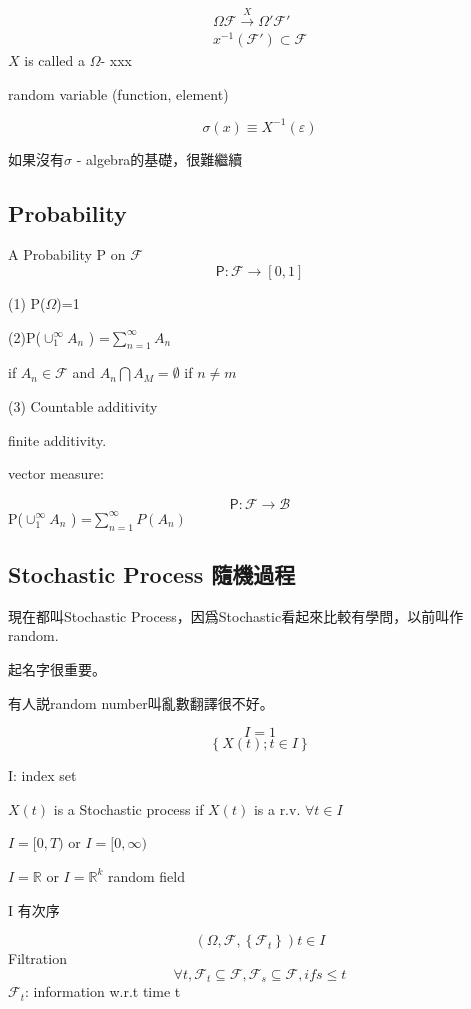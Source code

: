 \documentclass[UTF8,a4paper,14pt]{ctexart}
\theoremstyle{definition}
\theoremstyle{remark}
\begin{document}
\begin{equation}
  \begin{aligned}
   \Omega \mathcal{F}  \overset{X}{\rightarrow }\Omega' \mathcal{F}' \\
x^{-1}(\mathcal{F} ') \subset \mathcal{F}    
  \end{aligned}
\end{equation}
$X$ is called a $\Omega$- xxx

random variable (function, element)

\[\sigma (x)\equiv X^{-1}(\varepsilon )\]

如果沒有$\sigma$ - algebra的基礎，很難繼續

\subsection{Probability}
A Probability P on $\mathcal{F} $
\[\mathsf{P} :\mathcal{F} \rightarrow [0,1]\]

(1) P($\Omega$)=1

(2)P($\cup_1^{\infty} A_n$ ) =$ \sum_{n = 1}^{\infty} A_n   $

if \(A_n\in \mathcal{F}  \) and \(A_n \bigcap A_M = \emptyset  \) if \(n\neq m\)

(3) Countable additivity

finite additivity.

vector measure:

\[\mathsf{P} :\mathcal{F} \rightarrow \mathcal{B} \]
P($\cup_1^{\infty} A_n$ ) =$ \sum_{n = 1}^{\infty} P(A_n )  $


\subsection{Stochastic Process 隨機過程}

現在都叫Stochastic Process，因爲Stochastic看起來比較有學問，以前叫作random.

起名字很重要。

有人説random number叫亂數翻譯很不好。

\[I={1}\]
\[\left\{X(t);t\in I\right\}\]

I: index set

\(X(t)\) is a Stochastic process if \(X(t)\) is a r.v. \(\forall t \in I\)

\(I = [0,T)\) or \(I=[0,\infty)\)

\(I=\mathbb{R} \) or \(I=\mathbb{R}^k \) random field

I 有次序

\[(\Omega, \mathcal{F} ,\left\{\mathcal{F} _t\right\}) t\in I\]
Filtration
\[\forall t , \mathcal{F}_t \subseteq \mathcal{F}, \mathcal{F}_s \subseteq \mathcal{F}, if s\leq t\]
\( \mathcal{F}_t\): information w.r.t time t
\end{document}
